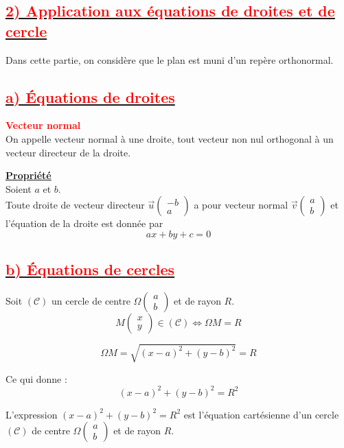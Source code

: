 \documentclass[12pt,a4paper]{article}
\begin{document}
\subsection*{\underline{\textbf{\textcolor{red}{2) Application aux équations de droites et de cercle}}}}

Dans cette partie, on considère que le plan est muni d'un repère orthonormal.

\subsection*{\underline{\textbf{\textcolor{red}{a) Équations de droites}}}}

\textbf{\textcolor{red}{Vecteur normal}} \\
On appelle vecteur normal à une droite, tout vecteur non nul orthogonal à un vecteur directeur de la droite.

\vspace{0.3cm}

\textbf{\underline{Propriété}} \\
Soient $a$ et $b$. \\
Toute droite de vecteur directeur $\vec{u}\begin{pmatrix} -b \\ a \end{pmatrix}$ a pour vecteur normal $\vec{v}\begin{pmatrix} a \\ b \end{pmatrix}$ et l'équation de la droite est donnée par 
\[
ax + by + c = 0
\]

\subsection*{\underline{\textbf{\textcolor{red}{b) Équations de cercles}}}}

Soit $(\mathcal{C})$ un cercle de centre $\Omega\begin{pmatrix} a \\ b \end{pmatrix}$ et de rayon $R$.
\[
M\begin{pmatrix} x \\ y \end{pmatrix} \in (\mathcal{C}) \iff \Omega M = R
\]

\[
\Omega M = \sqrt{(x - a)^2 + (y - b)^2} = R
\]

Ce qui donne :
\[
(x - a)^2 + (y - b)^2 = R^2
\]

L'expression $(x - a)^2 + (y - b)^2 = R^2$ est l'équation cartésienne d'un cercle $(\mathcal{C})$ de centre $\Omega \begin{pmatrix} a \\ b \end{pmatrix}$ et de rayon $R$.
\end{document}
